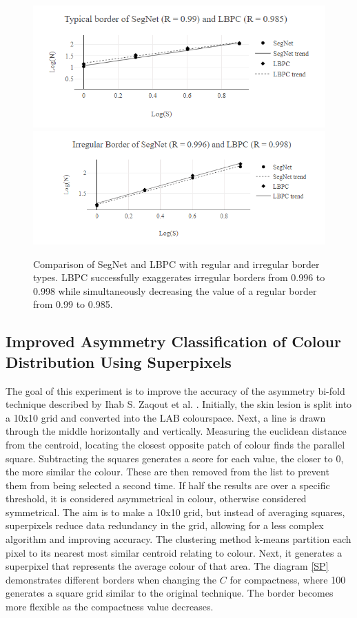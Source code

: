 \documentclass[10.5pt]{report}
\begin{document}
\begin{figure}
\centering
\includegraphics[scale=0.9]{typicalborder.png}
\includegraphics[scale=0.9]{atypicalborder.png}

\caption{Comparison of SegNet and LBPC with regular and irregular border types. LBPC successfully exaggerates irregular borders from 0.996 to 0.998 while simultaneously decreasing the value of a regular border from 0.99 to 0.985.} \label{fractal4}
\end{figure}

\subsection{Improved Asymmetry Classification of Colour Distribution Using Superpixels}
The goal of this experiment is to improve the accuracy of the asymmetry bi-fold technique described by Ihab S. Zaqout et al. \cite{Zaqout2016}. Initially, the skin lesion is split into a 10x10 grid and converted into the LAB colourspace. Next, a line is drawn through the middle horizontally and vertically. Measuring the euclidean distance from the centroid, locating the closest opposite patch of colour finds the parallel square. Subtracting the squares generates a score for each value, the closer to 0, the more similar the colour. These are then removed from the list to prevent them from being selected a second time. If half the results are over a specific threshold, it is considered asymmetrical in colour, otherwise considered symmetrical. The aim is to make a 10x10 grid, but instead of averaging squares, superpixels reduce data redundancy in the grid, allowing for a less complex algorithm and improving accuracy. The clustering method k-means partition each pixel to its nearest most similar centroid relating to colour. Next, it generates a superpixel that represents the average colour of that area. The diagram \ref{SP} demonstrates different borders when changing the $C$ for compactness, where 100 generates a square grid similar to the original technique. The border becomes more flexible as the compactness value decreases.
\end{document}
